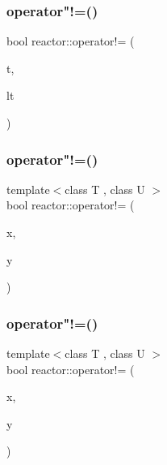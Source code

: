 \mbox{\label{namespacereactor_a084a8581290e7446f44cc2ca94c47fdf}} 
\subsubsection{\texorpdfstring{operator"!=()}{operator!=()}\hspace{0.1cm}{\footnotesize\ttfamily [3/11]}}
{\footnotesize\ttfamily bool reactor\+::operator!= (\begin{DoxyParamCaption}\item[{const \hyperlink{classreactor_1_1Tag}{Tag} \&}]{t,  }\item[{const \hyperlink{classreactor_1_1LogicalTime}{Logical\+Time} \&}]{lt }\end{DoxyParamCaption})\hspace{0.3cm}{\ttfamily [inline]}}

\mbox{\label{namespacereactor_a73f7e0bf8b9c8adf7cac8ecc521de7c7}} 
\subsubsection{\texorpdfstring{operator"!=()}{operator!=()}\hspace{0.1cm}{\footnotesize\ttfamily [4/11]}}
{\footnotesize\ttfamily template$<$class T , class U $>$ \\
bool reactor\+::operator!= (\begin{DoxyParamCaption}\item[{const \hyperlink{classreactor_1_1MutableValuePtr}{Mutable\+Value\+Ptr}$<$ T $>$ \&}]{x,  }\item[{const \hyperlink{classreactor_1_1MutableValuePtr}{Mutable\+Value\+Ptr}$<$ U $>$ \&}]{y }\end{DoxyParamCaption})}

\mbox{\label{namespacereactor_a79f6e5da337bd260b36b8e702160f1e6}} 
\subsubsection{\texorpdfstring{operator"!=()}{operator!=()}\hspace{0.1cm}{\footnotesize\ttfamily [5/11]}}
{\footnotesize\ttfamily template$<$class T , class U $>$ \\
bool reactor\+::operator!= (\begin{DoxyParamCaption}\item[{const \hyperlink{classreactor_1_1ImmutableValuePtr}{Immutable\+Value\+Ptr}$<$ T $>$ \&}]{x,  }\item[{const \hyperlink{classreactor_1_1ImmutableValuePtr}{Immutable\+Value\+Ptr}$<$ U $>$ \&}]{y }\end{DoxyParamCaption})}

